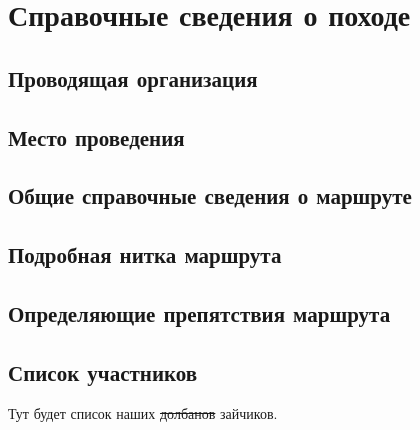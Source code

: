 \section{Справочные сведения о походе} 
\subsection{Проводящая организация}
\subsection{Место проведения}
\subsection{Общие справочные сведения о маршруте}
\subsection{Подробная нитка маршрута}
\subsection{Определяющие препятствия маршрута}
\subsection{Список участников} 
Тут будет список наших \sout{долбанов} зайчиков.
\newpage